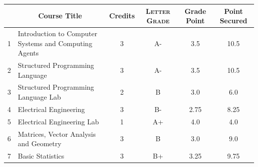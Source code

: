 \documentclass[11pt]{article}
\newcommand*{\numtwo}[1]{\pgfmathprintnumber[
                    fixed, precision=2, fixed zerofill=true]{#1}}
\begin{document}
                \begin{center}
                    \renewcommand{\arraystretch}{1.08}
                    
                \begin{tabular}{|c|l|c|>{\scshape}c|c|c|}
                \hline  \rule[-1ex]{0pt}{3.5ex} {\centering{\bf Course Code}} &  \multicolumn{1}{c|}{\textbf{Course Title}}  & {\bf Credits} & {\bf Letter Grade} & {\bf Grade Point} & {\bf Point Secured}  \\ 
                \hline   1 &  Introduction to Computer Systems and Computing Agents		 & 3 & A- & 3.5 & 10.5 \\ %
                \hline   2 &  Structured Programming Language		 & 3 & A- & 3.5 & 10.5 \\ %
                \hline   3 &  Structured Programming Language Lab		 & 2 & B & 3.0 & 6.0 \\ %
                \hline   4 &  Electrical Engineering		 & 3 & B- & 2.75 & 8.25 \\ %
                \hline   5 &  Electrical Engineering Lab		 & 1 & A+ & 4.0 & 4.0 \\ %
                \hline   6 &  Matrices, Vector Analysis and Geometry		 & 3 & B & 3.0 & 9.0 \\ %
                \hline   7 &  Basic Statistics		 & 3 & B+ & 3.25 & 9.75 \\ %

\hline                %
                \end{tabular}
                \end{center}
                \renewcommand{\arraystretch}{1.03}
\end{document}
